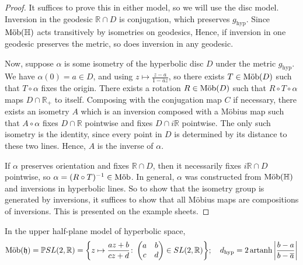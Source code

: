 \begin{proof}
	It suffices to prove this in either model, so we will use the disc model.
	Inversion in the geodesic \( \mathbb R \cap D \) is conjugation, which preserves \( g_{\text{hyp}} \).
	Since \( \text{M\"ob}(\mathbb H) \) acts transitively by isometries on geodesics,
	Hence, if inversion in one geodesic preserves the metric, so does inversion in any geodesic.

	Now, suppose \( \alpha \) is some isometry of the hyperbolic disc \( D \) under the metric \( g_{\text{hyp}} \).
	We have \( \alpha(0) = a \in D \), and using \( z \mapsto \frac{z - a}{1 - \overline a z} \), so there exists \( T \in \text{M\"ob}(D) \) such that \( T \circ \alpha \) fixes the origin.
	There exists a rotation \( R \in \text{M\"ob}(D) \) such that \( R \circ T \circ \alpha \) maps \( D \cap \mathbb R_+ \) to itself.
	Composing with the conjugation map \( C \) if necessary, there exists an isometry \( A \) which is an inversion composed with a M\"obius map such that \( A \circ \alpha \) fixes \( D \cap \mathbb R \) pointwise and fixes \( D \cap i\mathbb R \) pointwise.
	The only such isometry is the identity, since every point in \( D \) is determined by its distance to these two lines.
	Hence, \( A \) is the inverse of \( \alpha \).

	If \( \alpha \) preserves orientation and fixes \( \mathbb R \cap D \), then it necessarily fixes \( i\mathbb R \cap D \) pointwise, so \( \alpha = (R \circ T)^{-1} \in \text{M\"ob} \).
	In general, \( \alpha \) was constructed from \( \text{M\"ob}(\mathbb H) \) and inversions in hyperbolic lines.
	So to show that the isometry group is generated by inversions, it suffices to show that all M\"obius maps are compositions of inversions.
	This is presented on the example sheets.
\end{proof}
In the upper half-plane model of hyperbolic space,
\[
	\text{M\"ob}(\mathfrak{h}) = \mathbb PSL(2,\mathbb R) = \qty{z \mapsto \frac{az+b}{cz+d} \colon \begin{pmatrix}
			a & b \\
			c & d
		\end{pmatrix} \in SL(2,\mathbb R)};\quad d_{\text{hyp}} = 2 \operatorname{artanh} \abs{\frac{b - a}{b - \overline a}}
\]

